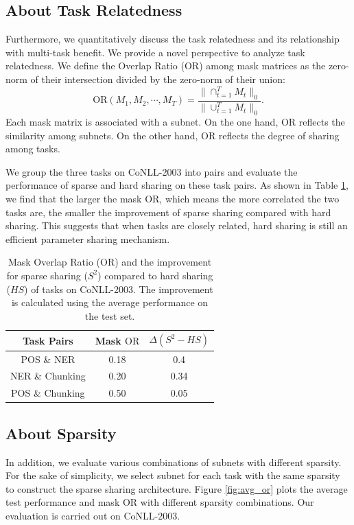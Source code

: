 \documentclass[letterpaper]{article} %
\begin{document}
\subsection{About Task Relatedness}

Furthermore, we quantitatively discuss the task relatedness and its relationship with multi-task benefit. We provide a novel perspective to analyze task relatedness.
We define the Overlap Ratio (OR) among mask matrices as the zero-norm of their intersection divided by the zero-norm of their union:
\begin{equation}\label{eq:or}
\mathrm{OR}(M_1, M_2, \cdots, M_T) = \frac{\| \cap_{t=1}^TM_t\|_0}{\|\cup_{t=1}^TM_t\|_0}.
\end{equation}
Each mask matrix is associated with a subnet. On the one hand, OR reflects the similarity among subnets. On the other hand, OR reflects the degree of sharing among tasks.

We group the three tasks on CoNLL-2003 into pairs and evaluate the performance of sparse and hard sharing on these task pairs. As shown in Table \ref{tb:task_or}, we find that the larger the mask OR, which means the more correlated the two tasks are, the smaller the improvement of sparse sharing compared with hard sharing. This suggests that when tasks are closely related, hard sharing is still an efficient parameter sharing mechanism.

\begin{table}[!htbp]
\centering
\begin{tabular}{ccc}
\toprule
Task Pairs & Mask $\mathrm{OR}$ & $\Delta(S^2-HS)$ \\ \midrule
POS \& NER & 0.18 & 0.4 \\
NER \& Chunking & 0.20 & 0.34 \\
POS \& Chunking & 0.50 & 0.05 \\ \bottomrule
\end{tabular}
\caption{Mask Overlap Ratio ($\mathrm{OR}$) and the improvement for sparse sharing ($S^2$) compared to hard sharing ($HS$) of tasks on CoNLL-2003. The improvement is calculated using the average performance on the test set.}
\label{tb:task_or}
\end{table}

\subsection{About Sparsity}
In addition, we evaluate various combinations of subnets with different sparsity. For the sake of simplicity, we select subnet for each task with the same sparsity to construct the sparse sharing architecture. Figure \ref{fig:avg_or} plots the average test performance and mask OR with different sparsity combinations. Our evaluation is carried out on CoNLL-2003.
\end{document}
